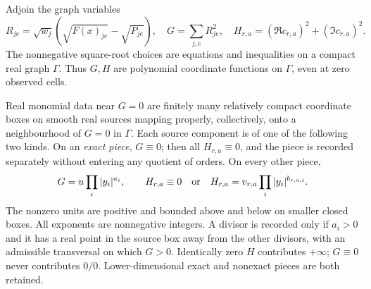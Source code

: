 Adjoin the graph variables
\[
 R_{je}=\sqrt{w_j}(\sqrt{F(x)_{je}}-\sqrt{P_{je}}),\quad
 G=\sum_{j,e}R_{je}^2,\quad
 H_{r,a}=(\Re c_{r,a})^2+(\Im c_{r,a})^2.
\]
The nonnegative square-root choices are equations and inequalities on a
compact real graph $\Gamma$. Thus $G,H$ are polynomial coordinate
functions on $\Gamma$, even at zero observed cells.

\begin{definition}\label{def:monomial}
Real monomial data near $G=0$ are finitely many relatively compact
coordinate boxes on smooth real sources mapping properly, collectively,
onto a neighbourhood of $G=0$ in $\Gamma$. Each source component is of
one of the following two kinds. On an \emph{exact piece}, $G\equiv0$;
then all $H_{r,a}\equiv0$, and the piece is recorded separately without
entering any quotient of orders. On every other piece,
\begin{equation}\label{eq:monomial}
 G=u\prod_i|y_i|^{a_i},\qquad
 H_{r,a}\equiv0\quad\hbox{or}\quad
 H_{r,a}=v_{r,a}\prod_i|y_i|^{b_{r,a,i}}.
\end{equation}
The nonzero units are positive and bounded above and below on smaller
closed boxes. All exponents are nonnegative integers. A divisor is
recorded only if $a_i>0$ and it has a real point in the source box away
from the other divisors, with an admissible transversal on which $G>0$.
Identically zero $H$ contributes $+\infty$; $G\equiv0$ never contributes
$0/0$. Lower-dimensional exact and nonexact pieces are both retained.
\end{definition}

